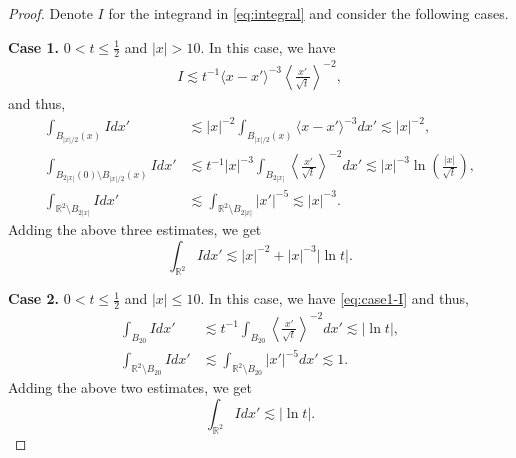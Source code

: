 \documentclass[12pt,reqno]{amsart}
\theoremstyle{plain}
\theoremstyle{definition}
\newcommand{\R}{\mathbb{R}}
\renewcommand{\:}{\colon}
\numberwithin{equation}{section}
\numberwithin{figure}{section}
\begin{document}
\begin{proof}
    Denote $I$ for the integrand in \eqref{eq:integral} and consider the following cases.

    \smallskip
    \textbf{Case 1.} $0 < t \le \frac12$ and $|x|>10$. In this case, we have
    \begin{align} \label{eq:case1-I}
        I \lesssim t^{-1} \langle x-x' \rangle^{-3}  \left\langle \frac{x'}{\sqrt{t}} \right\rangle^{-2},
    \end{align}
    and thus,
    \begin{align}
        \int_{B_{|x|/2}(x)} I dx' &\lesssim |x|^{-2} \int_{B_{|x|/2}(x) } \langle x-x' \rangle^{-3} dx' \lesssim |x|^{-2},\\
        \int_{B_{2|x|}(0) \setminus B_{|x|/2}(x)} I dx' &\lesssim t^{-1} |x|^{-3} \int_{B_{2|x|}} \left\langle \frac{x'}{\sqrt{t}} \right\rangle^{-2} dx' \lesssim |x|^{-3} \ln \left( \frac{|x|}{\sqrt{t}} \right), \\
        \int_{\R^2 \setminus B_{2|x|}} I dx' &\lesssim \int_{\R^2 \setminus B_{2|x|}} |x'|^{-5}  \lesssim |x|^{-3}.
    \end{align}
    Adding the above three estimates, we get 
    \begin{equation}
        \int_{\R^2} I dx' \lesssim |x|^{-2} + |x|^{-3} |\ln t|. 
    \end{equation}

    \smallskip
    \textbf{Case 2.} $0 < t \le \frac12$ and $|x| \le 10$. In this case, we have \eqref{eq:case1-I} and thus,
    \begin{align}
        \int_{B_{20}} I dx' &\lesssim t^{-1} \int_{B_{20}} \left\langle \frac{x'}{\sqrt{t}} \right\rangle^{-2} dx' \lesssim |\ln t|, \\
        \int_{\R^2 \setminus B_{20}} I dx' &\lesssim  \int_{\R^2 \setminus B_{20}} |x'|^{-5} dx' \lesssim 1.
    \end{align}
    Adding the above two estimates, we get
    \begin{equation}
        \int_{\R^2} I dx' \lesssim |\ln t|. 
    \end{equation}
    

\end{proof}
\end{document}
